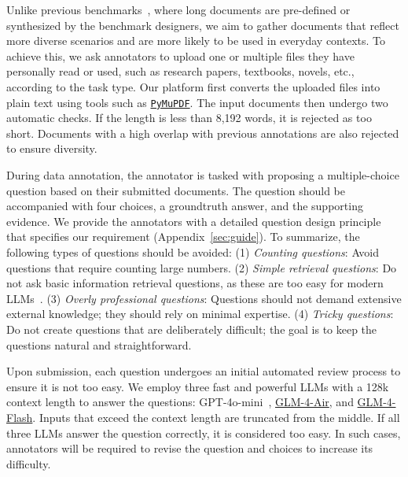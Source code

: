 Unlike previous benchmarks~\cite{bai2024longbench,an2024leval}, where long documents are pre-defined or synthesized by the benchmark designers, we aim to gather documents that reflect more diverse scenarios and are more likely to be used in everyday contexts. To achieve this, we ask annotators to upload one or multiple files they have personally read or used, such as research papers, textbooks, novels, etc., according to the task type.
Our platform first converts the uploaded files into plain text using tools such as \href{https://github.com/pymupdf/PyMuPDF}{\texttt{PyMuPDF}}.
The input documents then undergo two automatic checks. If the length is less than 8,192 words, it is rejected as too short. Documents with a high overlap with previous annotations are also rejected to ensure diversity.

During data annotation, the annotator is tasked with proposing a multiple-choice question based on their submitted documents. The question should be accompanied with four choices, a groundtruth answer, and the supporting evidence. We provide the annotators with a detailed question design principle that specifies our requirement (Appendix~\ref{sec:guide}). To summarize, the following types of questions should be avoided:
(1) \emph{Counting questions}: Avoid questions that require counting large numbers.
(2) \emph{Simple retrieval questions}: Do not ask basic information retrieval questions, as these are too easy for modern LLMs~\cite{song2024counting}.
(3) \emph{Overly professional questions}: Questions should not demand extensive external knowledge; they should rely on minimal expertise.
(4) \emph{Tricky questions}: Do not create questions that are deliberately difficult; the goal is to keep the questions natural and straightforward.

Upon submission, each question undergoes an initial automated review process to ensure it is not too easy. 
We employ three fast and powerful LLMs with a 128k context length to answer the questions: GPT-4o-mini~\cite{GPT-4o-mini}, \href{https://open.bigmodel.cn/pricing}{GLM-4-Air}, and \href{https://open.bigmodel.cn/pricing}{GLM-4-Flash}.
Inputs that exceed the context length are truncated from the middle.
If all three LLMs answer the question correctly, it is considered too easy. In such cases, annotators will be required to revise the question and choices to increase its difficulty.

